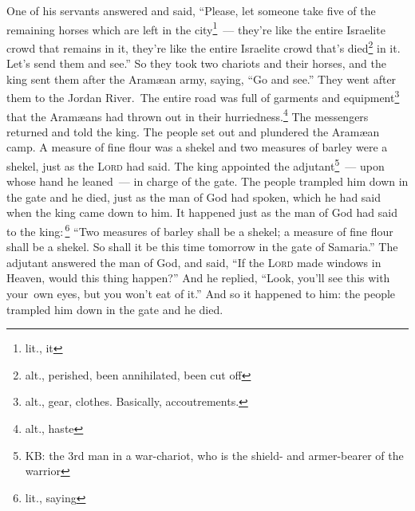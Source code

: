 \begin{inparaenum}
     One of his servants answered and said, ``Please, let someone take five of the remaining horses which are left in the city\understood\footnote{lit., it}~--- they're like the entire Israelite crowd that remains in it, they're like the entire Israelite crowd that's died\footnote{alt., perished, been annihilated, been cut off} in it. Let's send them and see.''%
     So they took two chariots and their horses, and the king sent them after the Aram\ae{}an army, saying, ``Go and see.''%
     They went after them to the Jordan River.\understood\ The entire road was full of garments and equipment\footnote{alt., gear, clothes. Basically, accoutrements.} that the Aram\ae{}ans had thrown out in their hurriedness.\footnote{alt., haste} The messengers returned and told the king.%
     The people set out and plundered the Aram\ae{}an camp. A measure of fine flour was a shekel and two measures of barley were a shekel, just as the \textsc{Lord} had said.%
     The king appointed the adjutant\footnote{KB: the 3rd man in a war-chariot, who is the shield- and armer-bearer of the warrior}~--- upon whose hand he leaned~--- in charge of the gate. The people trampled him down in the gate and he died, just as the man of God had spoken, which he had said when the king came down to him.%
     It happened just as the man of God had said to the king:\,\footnote{lit., saying} ``Two measures of barley shall be a shekel; a measure of fine flour shall be a shekel. So shall it be this time tomorrow in the gate of Samaria.''%
     The adjutant answered the man of God, and said, ``If the \textsc{Lord} made windows in Heaven, would this thing happen?'' And he replied, ``Look, you'll see this with your\understood\ own eyes, but you won't eat of it.''%
     And so it happened to him: the people trampled him down in the gate and he died.%
\end{inparaenum}
